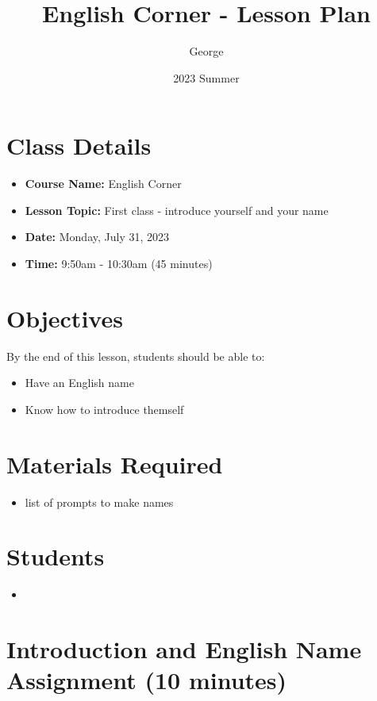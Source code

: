 \documentclass[12pt]{article}
\title{English Corner - Lesson Plan}
\author{George}
\date{2023 Summer}
\begin{document}
\maketitle

\section{Class Details}
\begin{itemize}
    \item \textbf{Course Name:} English Corner
    \item \textbf{Lesson Topic:}  First class - introduce yourself and your name 
    \item \textbf{Date:} Monday, July 31, 2023
    \item \textbf{Time:} 9:50am - 10:30am (45 minutes)
\end{itemize}

\section{Objectives}
By the end of this lesson, students should be able to:
\begin{itemize}
    \item Have an English name
    \item Know how to introduce themself

\end{itemize}

\section{Materials Required}
\begin{itemize}
   
    \item list of prompts to make names

  
\end{itemize}


\section{Students}
\begin{itemize}
    \item 

\end{itemize}
\section*{Introduction and English Name Assignment (10 minutes)}
\end{document}
